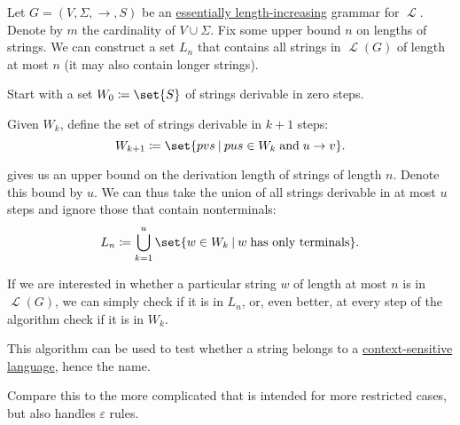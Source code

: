 \begin{algorithm}\label{alg:context_sensitive_string_membership}
  Let \( G = (V, \Sigma, \to, S) \) be an \hyperref[def:length_increasing_grammar]{essentially length-increasing} grammar for \( \mscrL \). Denote by \( m \) the cardinality of \( V \cup \Sigma \). Fix some upper bound \( n \) on lengths of strings. We can construct a set \( L_n \) that contains all strings in \( \mscrL(G) \) of length at most \( n \) (it may also contain longer strings).

  \begin{thmenum}
     Start with a set \( W_0 \coloneqq \set{ S } \) of strings derivable in zero steps.

     Given \( W_k \), define the set of strings derivable in \( k + 1 \) steps:
    \begin{equation*}
      W_{k+1} \coloneqq \set{ p v s \given p u s \in W_k \T{and} u \to v }.
    \end{equation*}

      gives us an upper bound on the derivation length of strings of length \( n \). Denote this bound by \( u \). We can thus take the union of all strings derivable in at most \( u \) steps and ignore those that contain nonterminals:
    \begin{equation*}
      L_n \coloneqq \bigcup_{k=1}^u \set{ w \in W_k \given w \T{has only terminals} }.
    \end{equation*}

     If we are interested in whether a particular string \( w \) of length at most \( n \) is in \( \mscrL(G) \), we can simply check if it is in \( L_n \), or, even better, at every step of the algorithm check if it is in \( W_k \).
  \end{thmenum}
\end{algorithm}
\begin{comments}
  \item This algorithm can be used to test whether a string belongs to a \hyperref[def:chomsky_hierarchy/context_sensitive]{context-sensitive language}, hence the name.

  \item Compare this to the more complicated  that is intended for more restricted cases, but also handles \( \varepsilon \) rules.
\end{comments}

